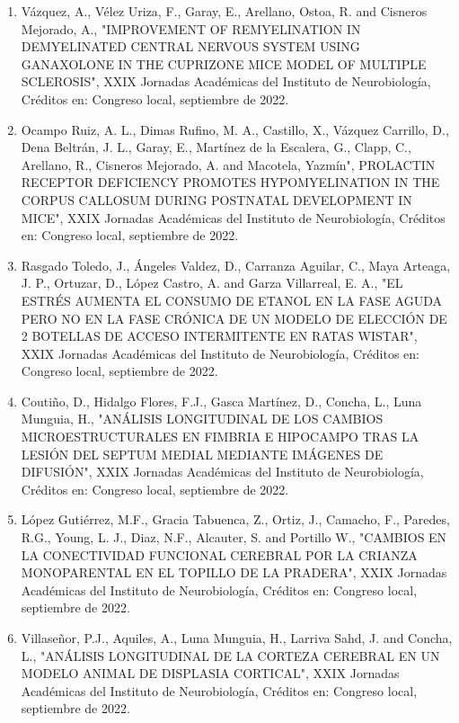 \begin{enumerate}
\item  Vázquez, A., Vélez Uriza, F., Garay, E., Arellano, Ostoa, R. and Cisneros Mejorado, A., "IMPROVEMENT OF REMYELINATION 
IN 
DEMYELINATED CENTRAL NERVOUS SYSTEM USING GANAXOLONE IN THE CUPRIZONE MICE MODEL OF MULTIPLE SCLEROSIS", XXIX Jornadas 
Académicas del Instituto de Neurobiología, Créditos en: Congreso local, septiembre de 2022.

\item  Ocampo Ruiz, A. L., Dimas Rufino, M. A., Castillo, X., Vázquez Carrillo, D., Dena Beltrán, J. L., Garay, E., Martínez 
de 
la Escalera, G., Clapp, C., Arellano, R., Cisneros Mejorado, A. and Macotela, Yazmín", PROLACTIN RECEPTOR DEFICIENCY PROMOTES 
HYPOMYELINATION IN THE CORPUS CALLOSUM DURING POSTNATAL DEVELOPMENT IN MICE", XXIX Jornadas Académicas del Instituto de 
Neurobiología, Créditos en: Congreso local, septiembre de 2022.

\item  Rasgado Toledo, J., Ángeles Valdez, D., Carranza Aguilar, C., Maya Arteaga, J. P., Ortuzar, D., López Castro, A. and 
Garza Villarreal, E. A., "EL ESTRÉS AUMENTA EL CONSUMO DE ETANOL EN LA FASE AGUDA PERO NO EN LA FASE CRÓNICA DE UN MODELO DE 
ELECCIÓN DE 2 BOTELLAS DE ACCESO INTERMITENTE EN RATAS WISTAR", XXIX Jornadas Académicas del Instituto de Neurobiología, 
Créditos en: Congreso local, septiembre de 2022.

\item  Coutiño, D., Hidalgo Flores, F.J., Gasca Martínez, D., Concha, L., Luna Munguia, H., "ANÁLISIS LONGITUDINAL DE LOS 
CAMBIOS MICROESTRUCTURALES EN FIMBRIA E HIPOCAMPO TRAS LA LESIÓN DEL SEPTUM MEDIAL MEDIANTE IMÁGENES DE DIFUSIÓN", XXIX 
Jornadas Académicas del Instituto de Neurobiología, Créditos en: Congreso local, septiembre de 2022.

\item  López Gutiérrez, M.F., Gracia Tabuenca, Z., Ortiz, J., Camacho, F., Paredes, R.G., Young, L. J., Diaz, N.F., Alcauter, 
S. 
and Portillo W., "CAMBIOS EN LA CONECTIVIDAD FUNCIONAL CEREBRAL POR LA CRIANZA MONOPARENTAL EN EL TOPILLO DE LA PRADERA", 
XXIX Jornadas Académicas del Instituto de Neurobiología, Créditos en: Congreso local, septiembre de 2022.

\item  Villaseñor, P.J., Aquiles, A., Luna Munguia, H., Larriva Sahd, J. and Concha, L., "ANÁLISIS LONGITUDINAL DE LA CORTEZA 
CEREBRAL EN UN MODELO ANIMAL DE DISPLASIA CORTICAL", XXIX Jornadas Académicas del Instituto de Neurobiología, Créditos en: 
Congreso local, septiembre de 2022.


\end{enumerate}

